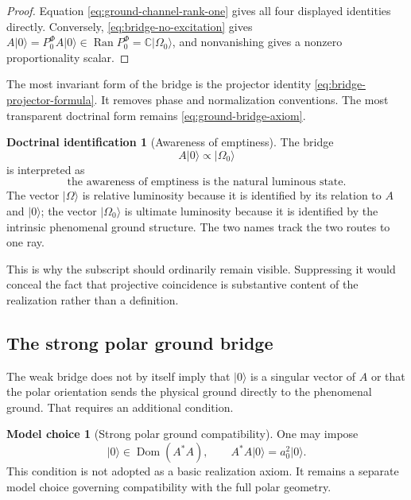 \documentclass[11pt,reqno]{scrartcl}
\newcommand{\CC}{\mathbb C}
\newcommand{\PzeroF}{P_{0}^{\Phi}}
\newcommand{\ket}[1]{\lvert #1\rangle}
\DeclareMathOperator{\Dom}{Dom}
\DeclareMathOperator{\Ran}{Ran}
\theoremstyle{plain}
\theoremstyle{definition}
\newtheorem{identification}[identification]{Doctrinal identification}
\newtheorem{modelchoice}[modelchoice]{Model choice}
\theoremstyle{remark}
\begin{document}
\begin{proof}
Equation \eqref{eq:ground-channel-rank-one} gives all four displayed
identities directly.  Conversely, \eqref{eq:bridge-no-excitation} gives
$A\ket0=\PzeroF A\ket0\in\Ran\PzeroF=\CC\ket{\Omega_0}$, and nonvanishing
gives a nonzero proportionality scalar.
\end{proof}

The most invariant form of the bridge is the projector identity
\eqref{eq:bridge-projector-formula}.  It removes phase and normalization
conventions.  The most transparent doctrinal form remains
\eqref{eq:ground-bridge-axiom}.

\begin{identification}[Awareness of emptiness]
\label{id:awareness-of-emptiness}
The bridge
\begin{equation}
  A\ket0\propto\ket{\Omega_0}
\end{equation}
is interpreted as
\begin{equation}
  \boxed{
  \text{the awareness of emptiness is the natural luminous state}.}
  \label{eq:awareness-of-emptiness-slogan}
\end{equation}
The vector $\ket\Omega$ is relative luminosity because it is identified by
its relation to $A$ and $\ket0$; the vector $\ket{\Omega_0}$ is ultimate
luminosity because it is identified by the intrinsic phenomenal ground
structure.  The two names track the two routes to one ray.
\end{identification}

This is why the subscript should ordinarily remain visible.  Suppressing it
would conceal the fact that projective coincidence is substantive content of
the realization rather than a definition.

\subsection{The strong polar ground bridge}

The weak bridge does not by itself imply that $\ket0$ is a singular vector of
$A$ or that the polar orientation sends the physical ground directly to the
phenomenal ground.  That requires an additional condition.

\begin{modelchoice}[Strong polar ground compatibility]
\label{choice:strong-polar-ground}
One may impose
\begin{equation}
  \ket0\in\Dom(A^*A),
  \qquad
  A^*A\ket0=a_0^2\ket0.
  \label{eq:strong-polar-ground}
\end{equation}
This condition is not adopted as a basic realization axiom.  It remains a
separate model choice governing compatibility with the full polar geometry.
\end{modelchoice}
\end{document}
